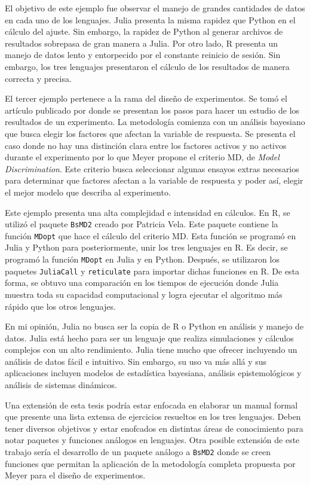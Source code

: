 El objetivo de este ejemplo fue observar el manejo de grandes cantidades de datos en cada uno de los lenguajes. \textsf{Julia} presenta la misma rapidez que \textsf{Python} en el cálculo del ajuste. Sin embargo, la rapidez de \textsf{Python} al generar archivos de resultados sobrepasa de gran manera a \textsf{Julia}. Por otro lado, \textsf{R} presenta un manejo de datos lento y entorpecido por el constante reinicio de sesión. Sin embargo, los tres lenguajes presentaron el cálculo de los resultados de manera correcta y precisa. 

El tercer ejemplo pertenece a la rama del diseño de experimentos. Se tomó el artículo publicado por \cite{meyer1996} donde se presentan los pasos para hacer un estudio de los resultados de un experimento. La metodología comienza con un análisis bayesiano que busca elegir los factores que afectan la variable de respuesta. Se presenta el caso donde no hay una distinción clara entre los factores activos y no activos durante el experimento por lo que Meyer propone el criterio MD, de \textit{Model Discrimination}. Este criterio busca seleccionar algunas ensayos extras necesarios para determinar que factores afectan a la variable de respuesta y poder así, elegir el mejor modelo que describa al experimento. 

Este ejemplo presenta una alta complejidad e intensidad en cálculos. En \textsf{R}, se utilizó el paquete \texttt{BsMD2} creado por Patricia Vela. Este paquete contiene la función \texttt{MDopt} que hace el cálculo del criterio MD. Esta función se programó en \textsf{Julia} y \textsf{Python} para posteriormente, unir los tres lenguajes en \textsf{R}. Es decir, se programó la función \texttt{MDopt} en \textsf{Julia} y en \textsf{Python}. Después, se utilizaron los paquetes \texttt{JuliaCall} y \texttt{reticulate} para importar dichas funciones en \textsf{R}. De esta forma, se obtuvo una comparación en los tiempos de ejecución donde \textsf{Julia} muestra toda su capacidad computacional y logra ejecutar el algoritmo más rápido que los otros lenguajes. 

En mi opinión, \textsf{Julia} no busca ser la copia de \textsf{R} o \textsf{Python} en análisis y manejo de datos. \textsf{Julia} está hecho para ser un lenguaje que realiza simulaciones y cálculos complejos con un alto rendimiento. \textsf{Julia} tiene mucho que ofrecer incluyendo un análisis de datos fácil e intuitivo. Sin embargo, su uso va más allá y sus aplicaciones incluyen modelos de estadística bayesiana, análisis epistemológicos y análisis de sistemas dinámicos. 

Una extensión de esta tesis podría estar enfocada en elaborar un manual formal que presente una lista extensa de ejercicios resueltos en los tres lenguajes. Deben tener diversos objetivos y estar enofcados en distintas áreas de conocimiento para notar paquetes y funciones análogos en lenguajes. Otra posible extensión de este trabajo sería el desarrollo de un paquete análogo a \texttt{BsMD2} donde se creen funciones que permitan la aplicación de la metodología completa propuesta por Meyer para el diseño de experimentos. 





